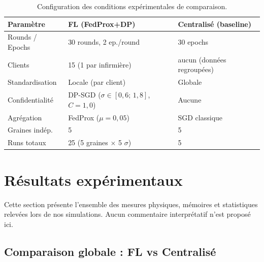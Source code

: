 \documentclass{article}
\begin{document}
\begin{table}[h!]
  \centering
  \caption{Configuration des conditions expérimentales de comparaison.}
  \label{tab:exp_config}
  \begin{tabular}{lll}
    \toprule
    Paramètre & FL (FedProx+DP) & Centralisé (baseline) \\
    \midrule
    Rounds / Epochs  & 30 rounds, 2 ep./round & 30 epochs \\
    Clients          & 15 (1 par infirmière)  & aucun (données regroupées) \\
    Standardisation  & Locale (par client)    & Globale \\
    Confidentialité  & DP-SGD ($\sigma \in [0{,}6;\, 1{,}8]$, $C=1{,}0$) & Aucune \\
    Agrégation       & FedProx ($\mu=0{,}05$) & SGD classique \\
    Graines indép.   & 5                      & 5 \\
    Runs totaux      & 25 (5 graines $\times$ 5 $\sigma$) & 5 \\
    \bottomrule
  \end{tabular}
\end{table}

\section{Résultats expérimentaux}
\label{sec:results}

Cette section présente l'ensemble des mesures physiques, mémoires et statistiques
relevées lors de nos simulations. Aucun commentaire interprétatif n'est proposé ici.

\subsection{Comparaison globale : FL vs Centralisé}
\label{subsec:global_comparison}
\end{document}
